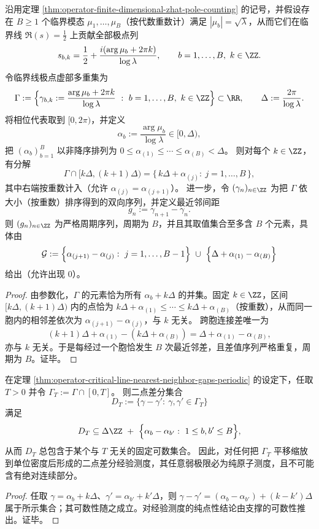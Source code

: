 \begin{theorem}\label{thm:operator-critical-line-nearest-neighbor-gaps-periodic}
沿用定理 \ref{thm:operator-finite-dimensional-zhat-pole-counting} 的记号，并假设存在
\(
B\ge 1
\)
个临界模态 \(\mu_1,\dots,\mu_B\)（按代数重数计）满足 \(|\mu_b|=\sqrt{\lambda}\)，从而它们在临界线 \(\Re(s)=\tfrac12\) 上贡献全部极点列
\[
s_{b,k}
=\frac12+\frac{i(\arg\mu_b+2\pi k)}{\log\lambda},
\qquad b=1,\dots,B,\ k\in\ZZ.
\]
令临界线极点虚部多重集为
\[
\Gamma:=\Bigl\{\gamma_{b,k}:=\frac{\arg\mu_b+2\pi k}{\log\lambda}\ :\ b=1,\dots,B,\ k\in\ZZ\Bigr\}\subset\RR,
\qquad
\Delta:=\frac{2\pi}{\log\lambda}.
\]
将相位代表取到 \([0,2\pi)\)，并定义
\[
\alpha_b:=\frac{\arg\mu_b}{\log\lambda}\in[0,\Delta),
\]
把 \((\alpha_b)_{b=1}^B\) 以非降序排列为 \(0\le \alpha_{(1)}\le\cdots\le \alpha_{(B)}<\Delta\)。
则对每个 \(k\in\ZZ\)，有分解
\[
\Gamma\cap[k\Delta,(k+1)\Delta)
=\bigl\{\,k\Delta+\alpha_{(j)}:\ j=1,\dots,B\,\bigr\},
\]
其中右端按重数计入（允许 \(\alpha_{(j)}=\alpha_{(j+1)}\)）。
进一步，令 \((\gamma_n)_{n\in\ZZ}\) 为把 \(\Gamma\) 依大小（按重数）排序得到的双向序列，并定义最近邻间距
\[
g_n:=\gamma_{n+1}-\gamma_n.
\]
则 \((g_n)_{n\in\ZZ}\) 为严格周期序列，周期为 \(B\)，并且其取值集合至多含 \(B\) 个元素，具体由
\[
\mathcal{G}
:=\Bigl\{\alpha_{(j+1)}-\alpha_{(j)}:\ j=1,\dots,B-1\Bigr\}\ \cup\ \Bigl\{\Delta+\alpha_{(1)}-\alpha_{(B)}\Bigr\}
\]
给出（允许出现 \(0\)）。
\end{theorem}
\begin{proof}
由参数化，\(\Gamma\) 的元素恰为所有 \(\alpha_b+k\Delta\) 的并集。固定 \(k\in\ZZ\)，区间 \([k\Delta,(k+1)\Delta)\) 内的点恰为 \(k\Delta+\alpha_{(1)}\le\cdots\le k\Delta+\alpha_{(B)}\)（按重数），从而同一胞内的相邻差依次为 \(\alpha_{(j+1)}-\alpha_{(j)}\)，与 \(k\) 无关。
跨胞连接差唯一为
\[
(k+1)\Delta+\alpha_{(1)}-(k\Delta+\alpha_{(B)})
=\Delta+\alpha_{(1)}-\alpha_{(B)},
\]
亦与 \(k\) 无关。于是每经过一个胞恰发生 \(B\) 次最近邻差，且差值序列严格重复，周期为 \(B\)。证毕。
\end{proof}

\begin{corollary}[二点差分的可数支撑与纯点型相关]\label{cor:operator-critical-line-paircorr-pure-point}
在定理 \ref{thm:operator-critical-line-nearest-neighbor-gaps-periodic} 的设定下，任取 \(T>0\) 并令 \(\Gamma_T:=\Gamma\cap[0,T]\)。
则二点差分集合
\[
D_T:=\{\gamma-\gamma':\ \gamma,\gamma'\in\Gamma_T\}
\]
满足
\[
D_T\subseteq
\Delta\ZZ\ +\ \Bigl\{\alpha_b-\alpha_{b'}:\ 1\le b,b'\le B\Bigr\},
\]
从而 \(D_T\) 总包含于某个与 \(T\) 无关的固定可数集合。
因此，对任何把 \(\Gamma_T\) 平移缩放到单位密度后形成的二点差分经验测度，其任意弱极限必为纯原子测度，且不可能含有绝对连续部分。
\end{corollary}
\begin{proof}
任取 \(\gamma=\alpha_b+k\Delta\)、\(\gamma'=\alpha_{b'}+k'\Delta\)，则
\(
\gamma-\gamma'=(\alpha_b-\alpha_{b'})+(k-k')\Delta
\)
属于所示集合；其可数性随之成立。对经验测度的纯点性结论由支撑的可数性推出。证毕。
\end{proof}

